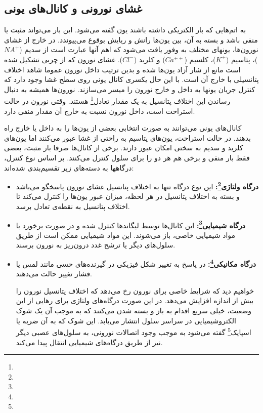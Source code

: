 \subsection{غشای نورونی و کانال‌های یونی}
به اتم‌هایی که بار الکتریکی داشته باشند یون گفته می‌شود. این بار می‌تواند مثبت یا منفی باشد و بسته به آن، بین یون‌ها رانش و ربایش بوقوع می‌پیوندد. در خارج از غشای نورون‌ها، یونهای مختلف به وفور یافت می‌شود که اهم آنها عبارت است از سدیم ($NA^+$)، پتاسیم ($K^+$)، کلسیم ($Ca^{++}$) و کلرید ($Cl^-$). غشای نورون که از چربی تشکیل شده است مانع از شار آزاد یون‌ها شده و بدین ترتیب داخل نورون عموما شاهد اختلاف پتانسیلی با خارج آن است. با این حال یکسری کانال یونی روی سطح غشا وجود دارد که کنترل جریان یونها به داخل و خارج نورون را میسر می‌سازند. نورون‌ها همیشه به دنبال رساندن این اختلاف پتانسیل به یک مقدار تعادل\footnote{} هستند. وقتی نورون در حالت استراحت است، داخل نورون نسبت به خارج آن مقدار منفی دارد. 

کانال‌های یونی می‌توانند به صورت انتخابی بعضی از یون‌ها را به داخل یا خارج راه بدهند. در حالت استراحت، یون‌های پتاسیم به راحتی از غشا عبور می‌کنند اما یون‌های کلرید و سدیم به سختی امکان عبور دارند. برخی از کانال‌ها صرفا بار مثبت، بعضی فقط بار منفی و برخی هم هر دو را برای سلول کنترل می‌کنند. بر اساس نوع کنترل، درگاهها به دسته‌های زیر تقسیم‌بندی شده‌اند:

\begin{itemize}
\item \textbf{درگاه ولتاژی\footnote{}:} این نوع درگاه تنها به اختلاف پتانسیل غشای نورون پاسخگو می‌باشد و بسته به اختلاف پتانسیل در هر لحظه، میزان عبور یون‌ها را کنترل می‌کند تا اختلاف پتانسیل به نقطه‌ی تعادل برسد.
\item \textbf{درگاه شیمیایی\footnote{}:} این کانال‌ها توسط لیگاند‌ها کنترل شده و در صورت برخورد با مواد شیمیایی خاصی، باز می‌شوند. این مواد شیمیایی ممکن است از طریق سلول‌های دیگر یا ترشح غدد درون‌ریز به نورون برسند.
\item \textbf{درگاه مکانیکی\footnote{}:} در پاسخ به تغییر شکل فیزیکی در گیرنده‌های حسی مانند لمس یا فشار تغییر حالت می‌دهند.

خواهیم دید که شرایط خاصی برای نورون رخ می‌دهد که اختلاف پتانسیل نورون را بیش از اندازه افزایش می‌دهد. در این صورت درگاه‌های ولتاژی برای رهایی از این وضعیت، خیلی سریع اقدام به باز و بسته شدن می‌کنند که به موجب آن یک شوک الکتروشیمیایی در سراسر سلول انتشار می‌یابد. این شوک که به آن ضربه یا اسپایک\footnote{} گفته می‌شود به موجب وجود اتصالات نورونی، به سلول‌های عصبی دیگر نیز از طریق درگاه‌های شیمیایی انتقال پیدا می‌کند. 

\end{itemize}

